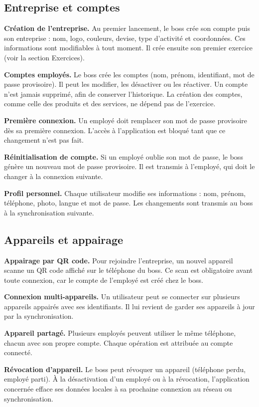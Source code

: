 \documentclass[11pt,a4paper]{article}
\newcommand{\fonc}[2]{\textbf{#1.} #2\par\vspace{0.2em}}
\begin{document}
	\subsection{Entreprise et comptes}
	
	\fonc{Création de l'entreprise}{Au premier lancement, le boss crée son compte puis son entreprise : nom, logo, couleurs, devise, type d'activité et coordonnées. Ces informations sont modifiables à tout moment. Il crée ensuite son premier exercice (voir la section Exercices).}
	
	\fonc{Comptes employés}{Le boss crée les comptes (nom, prénom, identifiant, mot de passe provisoire). Il peut les modifier, les désactiver ou les réactiver. Un compte n'est jamais supprimé, afin de conserver l'historique. La création des comptes, comme celle des produits et des services, ne dépend pas de l'exercice.}
	
	\fonc{Première connexion}{Un employé doit remplacer son mot de passe provisoire dès sa première connexion. L'accès à l'application est bloqué tant que ce changement n'est pas fait.}
	
	\fonc{Réinitialisation de compte}{Si un employé oublie son mot de passe, le boss génère un nouveau mot de passe provisoire. Il est transmis à l'employé, qui doit le changer à la connexion suivante.}
	
	\fonc{Profil personnel}{Chaque utilisateur modifie ses informations : nom, prénom, téléphone, photo, langue et mot de passe. Les changements sont transmis au boss à la synchronisation suivante.}
	
	\subsection{Appareils et appairage}
	
	\fonc{Appairage par QR code}{Pour rejoindre l'entreprise, un nouvel appareil scanne un QR code affiché sur le téléphone du boss. Ce scan est obligatoire avant toute connexion, car le compte de l'employé est créé chez le boss.}
	
	\fonc{Connexion multi-appareils}{Un utilisateur peut se connecter sur plusieurs appareils appairés avec ses identifiants. Il lui revient de garder ses appareils à jour par la synchronisation.}
	
	\fonc{Appareil partagé}{Plusieurs employés peuvent utiliser le même téléphone, chacun avec son propre compte. Chaque opération est attribuée au compte connecté.}
	
	\fonc{Révocation d'appareil}{Le boss peut révoquer un appareil (téléphone perdu, employé parti). À la désactivation d'un employé ou à la révocation, l'application concernée efface ses données locales à sa prochaine connexion au réseau ou synchronisation.}
	
\end{document}

